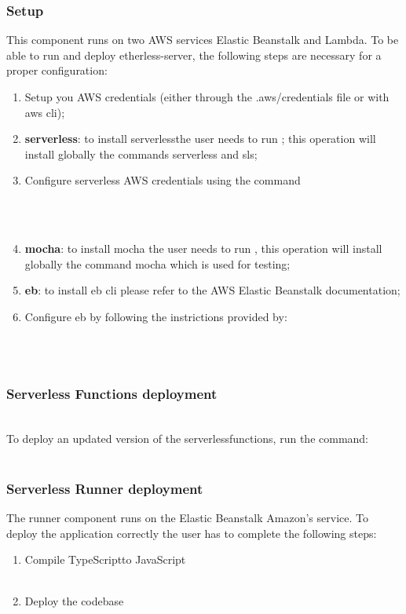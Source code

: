 \subsubsection{Setup}
This component runs on two AWS services Elastic Beanstalk and Lambda.
To be able to run and deploy etherless-server, the following steps are necessary for a proper configuration:
\begin{enumerate}
	\item Setup you AWS credentials (either through the .aws/credentials file or with aws cli);
	\item \textbf{serverless}: to install serverless\glo the user needs to run ; this operation will install globally the commands serverless and sls;
	\item Configure serverless AWS credentials using the command\\\\\centerline{}\\
    \item \textbf{mocha}: to install mocha the user needs to run , this operation will install globally the command mocha which is used for testing;
    \item \textbf{eb}: to install eb cli please refer to the AWS Elastic Beanstalk documentation;
    \item Configure eb by following the instrictions provided by: \\\\\centerline{}\\

\end{enumerate}
\subsubsection{Serverless Functions deployment}\\
To deploy an updated version of the serverless\glo functions, run the command:
\\\\ \centerline{}
\subsubsection{Serverless Runner deployment}
The runner component runs on the Elastic Beanstalk Amazon's service. To deploy the application correctly the user has to complete the following steps:
\begin{enumerate}
	\item Compile TypeScript\glo to JavaScript\glo \\\\ \centerline{}
	\item Deploy the codebase \\\\ \centerline{}
\end{enumerate}
